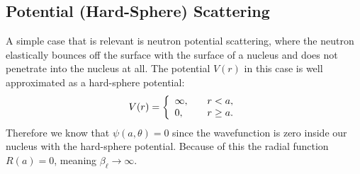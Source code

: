 \subsection{Potential (Hard-Sphere) Scattering}

A simple case that is relevant is neutron potential scattering, where the neutron elastically bounces off the surface with the surface of a nucleus and does not penetrate into the nucleus at all. The potential $V(r)$ in this case is well approximated as a hard-sphere potential:
\begin{align}
  V(r) = \left\{ \begin{array}{l l}
  \infty, 	& \quad r < a, \\
  0,		& \quad r \ge a. \\ \end{array} \right.
\end{align}
Therefore we know that $\psi(a,\theta) = 0$ since the wavefunction is zero inside our nucleus with the hard-sphere potential. Because of this the radial function $R(a) = 0$, meaning $\beta_\ell \rightarrow \infty$.

